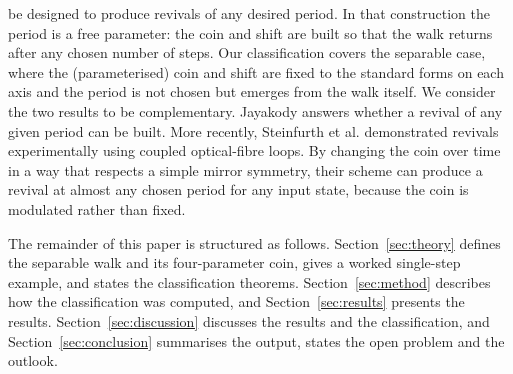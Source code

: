 \documentclass[aps,pra,reprint,amsmath,amssymb,superscriptaddress,floatfix]{revtex4-2}
\begin{document}
be designed to produce revivals of any desired period.  In that construction the period is a free
parameter: the coin and shift are built so that the walk returns after any chosen number of steps.
Our classification covers the separable case, where the (parameterised) coin and shift are fixed 
to the standard forms on each axis and the period is not chosen but emerges from the walk itself.
We consider the two results to be complementary. Jayakody answers whether a revival of any given period
can be built.  More recently, Steinfurth et al. \cite{Steinfurth2026} demonstrated revivals experimentally using coupled optical-fibre loops.  By changing the coin over time in a way that respects a simple mirror symmetry, their scheme can produce a revival at almost any chosen period for any input state, because the coin is modulated rather than fixed.
\par
The remainder of this paper is structured as follows.
Section~\ref{sec:theory} defines the separable walk and its
four-parameter coin, gives a worked single-step example, and
states the classification theorems. Section~\ref{sec:method}
describes how the classification was computed, and
Section~\ref{sec:results} presents the results.
Section~\ref{sec:discussion} discusses the results and the
classification, and Section~\ref{sec:conclusion} summarises
the output, states the open problem and the outlook.
\end{document}
